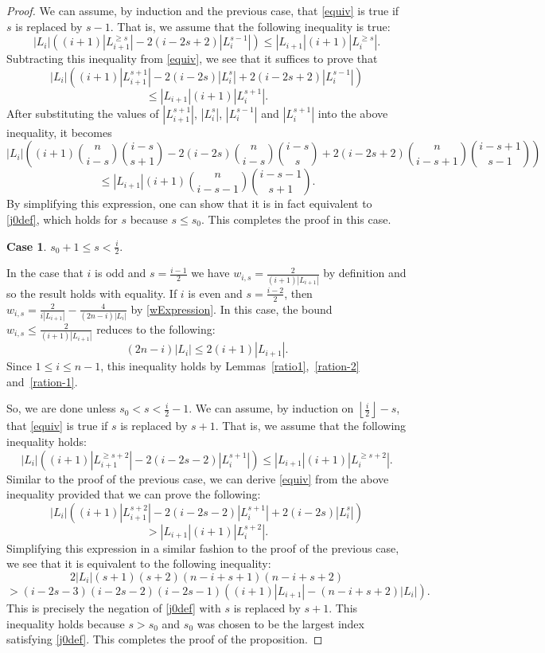 \documentclass[11 pt]{article}
\theoremstyle{definition}
\theoremstyle{case}
\newtheorem{case2}{Case}
\numberwithin{equation}{section}
\begin{document}
\begin{proof}
We can assume, by induction and the previous case, that \eqref{equiv} is true if $s$ is replaced by $s-1$. That is, we assume that the following inequality is true:
\[\left|L_i\right|\left((i+1)\left|L_{i+1}^{\geq s}\right| - 2(i-2s+2)\left|L_i^{s-1}\right|\right)\leq \left|L_{i+1}\right|(i+1)\left|L_i^{\geq s}\right|.\]
Subtracting this inequality from \eqref{equiv}, we see that it suffices to prove that
\[\left|L_i\right|\left((i+1)\left|L_{i+1}^{s+1}\right| - 2(i-2s)\left|L_i^s\right| + 2(i-2s+2)\left|L_i^{s-1}\right|\right) \]
\[\leq \left|L_{i+1}\right|(i+1)\left|L_i^{s+1}\right|.\]
After substituting the values of $\left|L_{i+1}^{s+1}\right|$, $\left|L_i^s\right|$, $\left|L_i^{s-1}\right|$ and $\left|L_i^{s+1}\right|$ into the above inequality, it becomes
\[\left|L_i\right|\left((i+1)\binom{n}{i-s}\binom{i-s}{s+1} - 2(i-2s)\binom{n}{i-s}\binom{i-s}{s} + 2(i-2s+2)\binom{n}{i-s+1}\binom{i-s+1}{s-1}\right)\]
\[\leq \left|L_{i+1}\right|(i+1)\binom{n}{i-s-1}\binom{i-s-1}{s+1}.\]
By simplifying this expression, one can show that it is in fact equivalent to \eqref{j0def}, which holds for $s$ because $s\leq s_0$. This completes the proof in this case. 

\begin{case2}
$s_0+1\leq s< \frac{i}{2}$. 
\end{case2}

In the case that $i$ is odd and $s=\frac{i-1}{2}$ we have $w_{i,s}=\frac{2}{(i+1)\left|L_{i+1}\right|}$ by definition and so the result holds with equality. If $i$ is even and $s=\frac{i-2}{2}$, then $w_{i,s} = \frac{2}{i|L_{i+1}|} - \frac{4}{(2n-i)|L_{i}|}$ by \eqref{wExpression}. In this case, the bound $w_{i,s}\leq \frac{2}{(i+1)\left|L_{i+1}\right|}$ reduces to the following:
\[(2n-i)|L_i|\leq 2(i+1)|L_{i+1}|.\]
Since $1\leq i\leq n-1$, this inequality holds by Lemmas~\ref{ratio1},~\ref{ration-2} and~\ref{ration-1}. 

So, we are done unless $s_0< s < \frac{i}{2}-1$. We can assume, by induction on $\left\lfloor\frac{i}{2}\right\rfloor-s$, that \eqref{equiv} is true if $s$ is replaced by $s+1$. That is, we assume that the following inequality holds:
\[\left|L_i\right|\left((i+1)\left|L_{i+1}^{\geq s+2}\right| - 2(i-2s-2)\left|L_i^{s+1}\right|\right)\leq \left|L_{i+1}\right|(i+1)\left|L_i^{\geq s+2}\right|.\]
Similar to the proof of the previous case, we can derive \eqref{equiv} from the above inequality provided that we can prove the following: 
\[\left|L_i\right|\left((i+1)\left|L_{i+1}^{s+2}\right| - 2(i-2s-2)\left|L_i^{s+1}\right| + 2(i-2s)\left|L_i^s\right|\right)\]
\[> \left|L_{i+1}\right|(i+1)\left|L_i^{s+2}\right|.\]
Simplifying this expression in a similar fashion to the proof of the previous case, we see that it is equivalent to the following inequality:
\[2\left|L_i\right|(s+1)(s+2)(n-i+s+1)(n-i+s+2)\]
\[> (i-2s-3)(i-2s-2)(i-2s-1)\left((i+1)\left|L_{i+1}\right| - (n-i+s+2)\left|L_i\right|\right).\]
This is precisely the negation of \eqref{j0def} with $s$ is replaced by $s+1$. This inequality holds because $s>s_0$ and $s_0$ was chosen to be the largest index satisfying \eqref{j0def}. This completes the proof of the proposition.
\end{proof}
\end{document}
